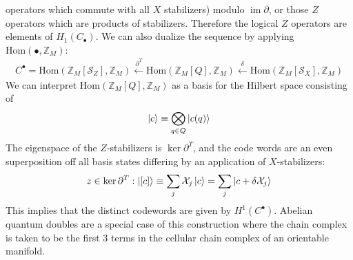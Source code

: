 \documentclass{article}
\theoremstyle{definition}
\theoremstyle{definition}
\newcommand{\im}{\operatorname{im}}
\newcommand{\Z}{\mathbb Z}
\newcommand{\Hom}{\text{Hom}}
\begin{document}
operators which commute with all $X$ stabilizers) modulo $\im \partial$, or
those $Z$ operators which are products of stabilizers. Therefore the logical $Z$
operators are elements of $H_1(C_\bullet)$. We can also dualize the sequence by
applying $\Hom(\bullet, \Z_M)$:
\begin{align}
C^\bullet = \Hom(\Z_{M}[\mathcal S_Z], \Z_M) \xleftarrow{\partial^T} \Hom(\Z_M[Q], \Z_M) \xleftarrow{\delta} \Hom(\Z_M[\mathcal S_X], \Z_M)
\end{align}
We can interpret $\Hom(\Z_M[Q], \Z_M)$ as a
basis for the Hilbert space consisting of
\begin{align}
  \ket{c} \equiv \bigotimes_{q \in Q}\ket{c(q)}
\end{align}
The eigenspace of the $Z$-stabilizers is $\ker{\partial^T}$, and the code words
are an even superposition off all basis states differing by an application of $X$-stabilizers:
\begin{align}
  z \in \ker{\partial^T}: \ket{[c]} \equiv \sum_{j}\mathcal X_j\ket{c} = \sum_{j}\ket{c+\delta \mathcal X_j}
\end{align}
This implies that the distinct codewords are given by $H^1(C^\bullet)$. Abelian quantum doubles are a special case of
this construction where the chain complex is taken to be the first 3 terms in
the cellular chain complex of an orientable manifold.
\end{document}
